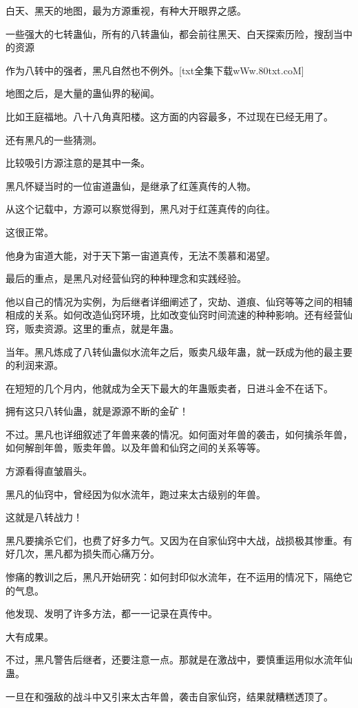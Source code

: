 \begin{this_body}
白天、黑天的地图，最为方源重视，有种大开眼界之感。

一些强大的七转蛊仙，所有的八转蛊仙，都会前往黑天、白天探索历险，搜刮当中的资源

作为八转中的强者，黑凡自然也不例外。[txt全集下载wWw.80txt.coM]

地图之后，是大量的蛊仙界的秘闻。

比如王庭福地。八十八角真阳楼。这方面的内容最多，不过现在已经无用了。

还有黑凡的一些猜测。

比较吸引方源注意的是其中一条。

黑凡怀疑当时的一位宙道蛊仙，是继承了红莲真传的人物。

从这个记载中，方源可以察觉得到，黑凡对于红莲真传的向往。

这很正常。

他身为宙道大能，对于天下第一宙道真传，无法不羡慕和渴望。

最后的重点，是黑凡对经营仙窍的种种理念和实践经验。

他以自己的情况为实例，为后继者详细阐述了，灾劫、道痕、仙窍等等之间的相辅相成的关系。如何改造仙窍环境，比如改变仙窍时间流速的种种影响。还有经营仙窍，贩卖资源。这里的重点，就是年蛊。

当年。黑凡炼成了八转仙蛊似水流年之后，贩卖凡级年蛊，就一跃成为他的最主要的利润来源。

在短短的几个月内，他就成为全天下最大的年蛊贩卖者，日进斗金不在话下。

拥有这只八转仙蛊，就是源源不断的金矿！

不过。黑凡也详细叙述了年兽来袭的情况。如何面对年兽的袭击，如何擒杀年兽，如何解剖年兽，贩卖年兽。以及年兽和仙窍之间的关系等等。

方源看得直皱眉头。

黑凡的仙窍中，曾经因为似水流年，跑过来太古级别的年兽。

这就是八转战力！

黑凡要擒杀它们，也费了好多力气。又因为在自家仙窍中大战，战损极其惨重。有好几次，黑凡都为损失而心痛万分。

惨痛的教训之后，黑凡开始研究：如何封印似水流年，在不运用的情况下，隔绝它的气息。

他发现、发明了许多方法，都一一记录在真传中。

大有成果。

不过，黑凡警告后继者，还要注意一点。那就是在激战中，要慎重运用似水流年仙蛊。

一旦在和强敌的战斗中又引来太古年兽，袭击自家仙窍，结果就糟糕透顶了。


\end{this_body}
